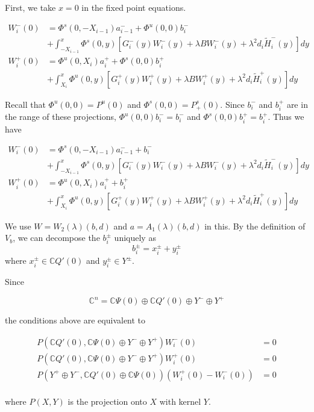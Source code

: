 \documentclass[12pt]{article}
\def\C{{\mathbb C}}
\begin{document}
First, we take $x = 0$ in the fixed point equations.

\begin{align*}
W_i^-(0) &= \Phi^s(0, -X_{i-1})a^-_{i-1} + \Phi^u(0, 0)b_i^- \\
&+ \int_{-X_{i-1}}^x \Phi^s(0, y)[G_i^-(y) W_i^-(y) + \lambda B W_i^-(y) + \lambda^2 d_i \tilde{H}_i^-(y)] dy \\
W_i^+(0) &= \Phi^u(0, X_i)a^+_{i} + \Phi^s(0, 0)b_i^+ \\
&+ \int_{X_{i}}^x \Phi^u(0, y)[G_i^+(y) W_i^+(y) + \lambda B W_i^+(y) + \lambda^2 d_i \tilde{H}_i^+(y) ] dy
\end{align*}

Recall that $\Phi^u(0, 0) = P^u(0)$ and $\Phi^s(0, 0) = P^s_+(0)$. Since $b_i^-$ and $b_i^+$ are in the range of these projections, $\Phi^u(0, 0)b_i^- = b_i^-$ and $\Phi^s(0, 0)b_i^+ = b_i^+ $. Thus we have

\begin{align*}
W_i^-(0) &= \Phi^s(0, -X_{i-1})a^-_{i-1} + b_i^- \\
&+ \int_{-X_{i-1}}^x \Phi^s(0, y)[G_i^-(y) W_i^-(y) + \lambda B W_i^-(y) + \lambda^2 d_i \tilde{H}_i^-(y)] dy \\
W_i^+(0) &= \Phi^u(0, X_i)a^+_{i} + b_i^+ \\
&+ \int_{X_{i}}^x \Phi^u(0, y)[G_i^+(y) W_i^+(y) + \lambda B W_i^+(y) + \lambda^2 d_i \tilde{H}_i^+(y) ] dy
\end{align*}

We use $W = W_2(\lambda)(b,d)$ and $a = A_1(\lambda)(b,d)$ in this. By the definition of $V_b$, we can decompose the $b_i^\pm$ uniquely as
\[
b_i^\pm = x_i^\pm + y_i^\pm
\]
where $x_i^\pm \in \C Q'(0)$ and $y_i^\pm \in Y^\pm$. 

Since

\[
\C^n = \C\Psi(0) \oplus \C Q'(0) \oplus Y^- \oplus Y^+
\]

the conditions above are equivalent to

\begin{align*}\label{projeq}
P(\C Q'(0), \C\Psi(0) \oplus Y^- \oplus Y^+)W_i^-(0) &= 0 \\
P(\C Q'(0), \C\Psi(0) \oplus Y^- \oplus Y^+)W_i^+(0) &= 0 \\
P(Y^+ \oplus Y^-, \C Q'(0) \oplus \C\Psi(0) )(W_i^+(0) - W_i^-(0)) &= 0 \\
\end{align*}

where $P(X,Y)$ is the projection onto $X$ with kernel $Y$.
\end{document}
